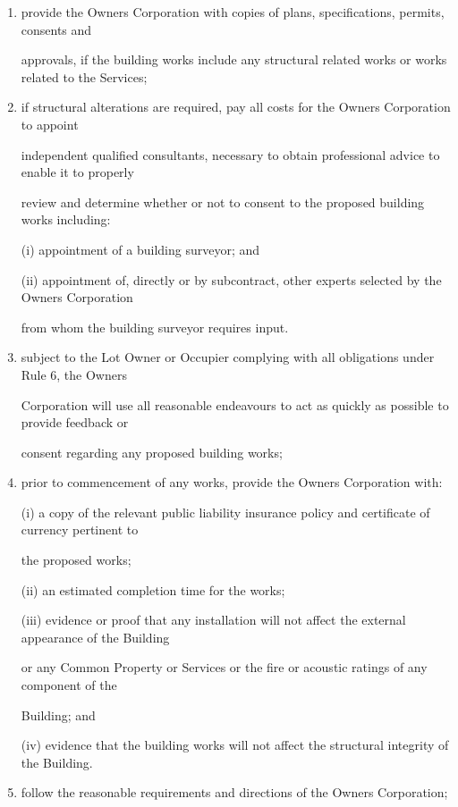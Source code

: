 \documentclass{article}
\begin{document}
\begin{enumerate}[label=\arabic*.]
\begin{enumerate}[label=\arabic{enumi}.\arabic*.]
\begin{enumerate}[label=(\arabic*)]
\begin{enumerate}[label=(\alph*)]
\item  provide the Owners Corporation with copies of plans, specifications, permits, consents and 

approvals, if the building works include any structural related works or works related to the Services; 

\item  if structural alterations are required, pay all costs for the Owners Corporation to appoint 

independent qualified consultants, necessary to obtain professional advice to enable it to properly 

review and determine whether or not to consent to the proposed building works including: 

(i) appointment of a building surveyor; and 

(ii) appointment of, directly or by subcontract, other experts selected by the Owners Corporation 

from whom the building surveyor requires input. 

\item  subject to the Lot Owner or Occupier complying with all obligations under Rule 6, the Owners 

Corporation will use all reasonable endeavours to act as quickly as possible to provide feedback or 

consent regarding any proposed building works; 

\item  prior to commencement of any works, provide the Owners Corporation with: 

(i) a copy of the relevant public liability insurance policy and certificate of currency pertinent to 

the proposed works; 

(ii) an estimated completion time for the works; 

(iii) evidence or proof that any installation will not affect the external appearance of the Building 

or any Common Property or Services or the fire or acoustic ratings of any component of the 

\newpage

Building; and 

(iv) evidence that the building works will not affect the structural integrity of the Building. 

\item  follow the reasonable requirements and directions of the Owners Corporation; 


\end{enumerate}
\end{enumerate}
\end{enumerate}
\end{enumerate}
\end{document}

